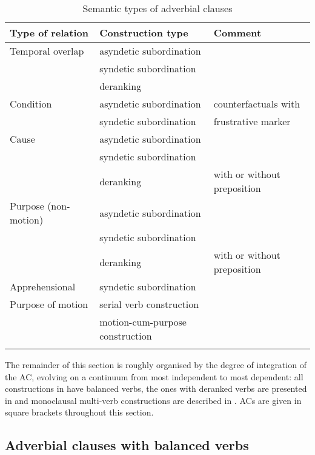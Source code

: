 \begin{table}
\caption{Semantic types of adverbial clauses}

\begin{tabularx}{\textwidth}{lQQ}
\lsptoprule
Type of relation & Construction type & Comment \\
\midrule
Temporal overlap & asyndetic subordination & \\
& syndetic subordination & \\
& deranking & \\
Condition & asyndetic subordination & counterfactuals with \\
& syndetic subordination & frustrative marker\\
Cause & asyndetic subordination & \\
& syndetic subordination & \\
& deranking & with or without preposition\\
Purpose (non-motion) & asyndetic subordination & \\
 & syndetic subordination & \\
& deranking & with or without preposition \\
Apprehensional & syndetic subordination & \\
Purpose of motion & serial verb construction &\\
& motion-cum-purpose construction & \\
\lspbottomrule
\end{tabularx}

\label{table:AC-Types}
\end{table}


The remainder of this section is roughly organised by the degree of integration of the AC, evolving on a continuum from most independent to most dependent: all constructions in  have balanced verbs, the ones with deranked verbs are presented in  and monoclausal multi-verb constructions are described in . ACs are given in square brackets throughout this section. 

\subsection{Adverbial clauses with balanced verbs}\label{sec:AdverbialJuxtaposition}

